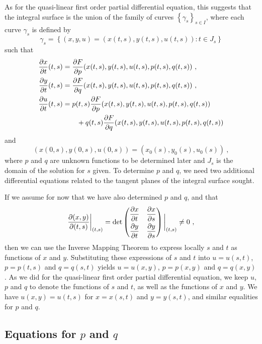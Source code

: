 As for the quasi-linear first order partial differential equation,
this suggests that the integral surface is the union of the family of curves
$\displaystyle \left\{\gamma_s\right\}_{s\in I}$, where
each curve $\gamma_s$ is defined by
\[
\gamma_s = \left\{ (x,y,u) = (x(t,s) , y(t,s) , u(t,s)) : t \in J_s \right\}
\]
such that
\begin{equation} \label{char_CE_GPDE1}
\begin{split}
\frac{\partial{x}}{\partial t}(t,s) &= \frac{\partial{F}}{\partial p}(x(t,s),y(t,s),u(t,s),p(t,s),q(t,s)) \ , \\
\frac{\partial{y}}{\partial t}(t,s) &= \frac{\partial{F}}{\partial q}(x(t,s),y(t,s),u(t,s),p(t,s),q(t,s)) \ , \\
\frac{\partial{u}}{\partial t}(t,s) &= p(t,s) \frac{\partial{F}}{\partial p}(x(t,s),y(t,s),u(t,s),p(t,s),q(t,s)) \\
& \qquad + q(t,s)  \frac{\partial{F}}{\partial q}(x(t,s),y(t,s),u(t,s),p(t,s),q(t,s))
\end{split}
\end{equation}
and
\[
\left(x(0,s),y(0,s),u(0,s)\right) = \left(x_0(s), y_0(s), u_0(s)\right) \ ,
\]
where $p$ and $q$ are unknown functions to be determined later and
$J_s$ is the domain of the solution for $s$ given.
To determine $p$ and $q$, we need two additional differential
equations related to the tangent planes of the integral surface
sought.

If we assume for now that we have also determined $p$ and $q$, and
that
\begin{equation} \label{char_IFTG_cond}
\frac{\partial(x,y)}{\partial(t,s)}\bigg|_{(t,s)} = \det
\begin{pmatrix}
\displaystyle \frac{\partial{x}}{\partial t} & \displaystyle \frac{\partial{x}}{\partial s} \\[0.7em]
\displaystyle \frac{\partial{y}}{\partial t} & \displaystyle \frac{\partial{y}}{\partial s}
\end{pmatrix}\bigg|_{(t,s)} \neq 0 \ ,
\end{equation}
then we can use the Inverse Mapping Theorem to express locally $s$ and
$t$ as functions of $x$ and $y$.  Substituting these expressions of
$s$ and $t$ into $u=u(s,t)$, $p=p(t,s)$ and $q=q(s,t)$ yields
$u=u(x,y)$, $p=p(x,y)$ and $q=q(x,y)$.  As we did for the quasi-linear
first order partial differential equation, we keep $u$, $p$ and $q$ to
denote the functions of $s$ and $t$, as well as the functions of $x$
and $y$.  We have $u(x,y) = u(t,s)$ for $x=x(s,t)$ and $y=y(s,t)$, and similar
equalities for $p$ and $q$.

\subsection{Equations for $p$ and $q$}

